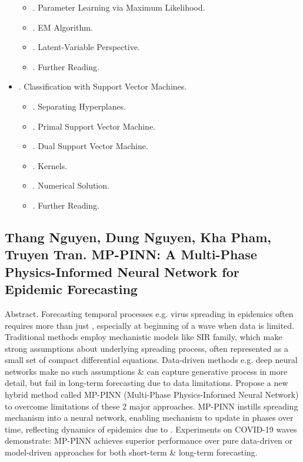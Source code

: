 \documentclass{article}
\begin{document}
\begin{itemize}
\begin{itemize}
		\item {. Parameter Learning via Maximum Likelihood.}
		\item {. EM Algorithm.}
		\item {. Latent-Variable Perspective.}
		\item {. Further Reading.}
	\end{itemize}
	\item {. Classification with Support Vector Machines.}
	\begin{itemize}
		\item {. Separating Hyperplanes.}
		\item {. Primal Support Vector Machine.}
		\item {. Dual Support Vector Machine.}
		\item {. Kernels.}
		\item {. Numerical Solution.}
		\item {. Further Reading.}
	\end{itemize}
\end{itemize}


\subsection{{\sc Thang Nguyen, Dung Nguyen, Kha Pham, Truyen Tran}. MP-PINN: A Multi-Phase Physics-Informed Neural Network for Epidemic Forecasting}
{\sf Abstract.} Forecasting temporal processes e.g. virus spreading in epidemics often requires more than just , especially at beginning of a wave when data is limited. Traditional methods employ mechanistic models like SIR family, which make strong assumptions about underlying spreading process, often represented as a small set of compact differential equations. Data-driven methods e.g. deep neural networks make no such assumptions \& can capture generative process in more detail, but fail in long-term forecasting due to data limitations. Propose a new hybrid method called MP-PINN (Multi-Phase Physics-Informed Neural Network) to overcome limitations of these 2 major approaches. MP-PINN instills spreading mechanism into a neural network, enabling mechanism to update in phases over time, reflecting dynamics of epidemics due to . Experiments on COVID-19 waves demonstrate: MP-PINN achieves superior performance over pure data-driven or model-driven approaches for both short-term \& long-term forecasting.
\end{document}
